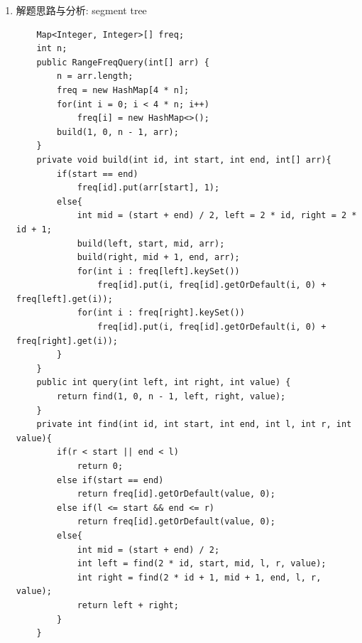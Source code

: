 \documentclass[9pt, b5paaper]{book}
\begin{document}
\begin{enumerate}
\begin{verbatim}
    }
    public int query(int left, int right, int value) {
        List<Integer> A = map.get(value);
        if (A == null || left > A.get(A.size()-1) || right < A.get(0))
            return 0;
        int i = ceil(A, left), j = floor(A, right);        
        return j-i+1;
    }
    public int ceil(List<Integer> A, int x){
        int left = 0, right = A.size()-1; 
        if (x < A.get(0))
            return 0;
        while (left < right) {
            int mid = (left+right)/2;
            if (A.get(mid) < x)
                left = mid + 1;
            else 
                right = mid;
        }
        return left;
    }
    public int floor(List<Integer> A, int x){
        int left = 0, right = A.size ()-1; 
        if (x > A.get (right))
            return right;
        while (left < right) {
            int mid =  (left+right)/2+1;
            if (A.get (mid) > x)
                right = mid - 1;
            else 
                left = mid;
        }
        return left;
    }
\end{verbatim}
\item 解题思路与分析: segment tree
\label{sec-7-0-5-3}
\begin{verbatim}
    Map<Integer, Integer>[] freq;
    int n;
    public RangeFreqQuery(int[] arr) {
        n = arr.length;
        freq = new HashMap[4 * n];
        for(int i = 0; i < 4 * n; i++)
            freq[i] = new HashMap<>();
        build(1, 0, n - 1, arr);
    }
    private void build(int id, int start, int end, int[] arr){
        if(start == end)
            freq[id].put(arr[start], 1);
        else{
            int mid = (start + end) / 2, left = 2 * id, right = 2 * id + 1;
            build(left, start, mid, arr);
            build(right, mid + 1, end, arr);
            for(int i : freq[left].keySet())
                freq[id].put(i, freq[id].getOrDefault(i, 0) + freq[left].get(i));
            for(int i : freq[right].keySet())
                freq[id].put(i, freq[id].getOrDefault(i, 0) + freq[right].get(i));
        }
    }
    public int query(int left, int right, int value) {
        return find(1, 0, n - 1, left, right, value);
    }
    private int find(int id, int start, int end, int l, int r, int value){
        if(r < start || end < l)
            return 0;
        else if(start == end)
            return freq[id].getOrDefault(value, 0);
        else if(l <= start && end <= r)
            return freq[id].getOrDefault(value, 0);
        else{
            int mid = (start + end) / 2;
            int left = find(2 * id, start, mid, l, r, value);
            int right = find(2 * id + 1, mid + 1, end, l, r, value);
            return left + right;
        }
    }
\end{verbatim}
\end{enumerate}
\end{document}
